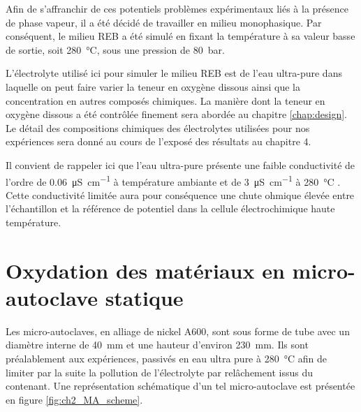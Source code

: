 \begin{refsection}
    Afin de s'affranchir de ces potentiels problèmes expérimentaux liés à la présence de phase vapeur, il a été décidé de
    travailler en milieu monophasique. Par conséquent, le milieu REB a été simulé en fixant la température à sa valeur
    basse de sortie, soit \SI{280}{\degreeCelsius}, sous une pression de \SI{80}{\bar}.

    L'électrolyte utilisé ici pour simuler le milieu REB est de l'eau ultra-pure 
    dans laquelle on peut faire varier la teneur en oxygène dissous ainsi que la
    concentration en autres composés chimiques. 
    La manière dont la teneur en oxygène dissous a été contrôlée finement sera abordée au chapitre \ref{chap:design}.
    Le
    détail des compositions chimiques des électrolytes utilisées pour nos expériences sera donné au cours de l'exposé
    des résultats au chapitre 4.

    Il convient de rappeler ici que l'eau ultra-pure présente une faible conductivité de l'ordre de 
    \SI{0.06}{\micro\siemens\per\centi\meter} à température ambiante et de \SI{3}{\micro\siemens\per\centi\meter} à
    \SI{280}{\degreeCelsius} \citep{IAEA1997}. Cette conductivité limitée aura pour conséquence une chute
    ohmique élevée entre l'échantillon et la référence de potentiel dans la cellule électrochimique haute température. 
    
     
   

\section[Oxydation des matériaux en micro-autoclave statique]%
{Oxydation des matériaux en micro-autoclave statique}\label{sec:ch2_MA_oxydation}

    Les micro-autoclaves, en alliage de nickel A600, sont sous forme de tube avec 
    un diamètre interne de \SI{40}{\milli\meter} et une hauteur
    d'environ \SI{230}{\milli\meter}. Ils sont préalablement aux expériences, 
    passivés en eau ultra pure à \SI{280}{\degreeCelsius}
    afin de
    limiter par la suite la pollution de l'électrolyte par relâchement issus du contenant.
    Une représentation schématique d'un tel micro-autoclave est
    présentée en figure \ref{fig:ch2_MA_scheme}.


\end{refsection}
